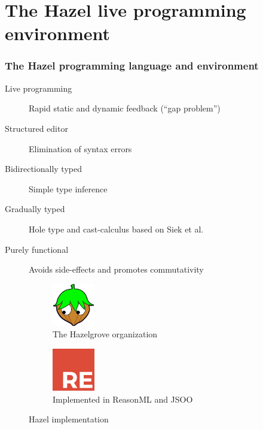 \documentclass{beamer}
\begin{document}
\section{The Hazel live programming environment}

\begin{frame}
  \frametitle{The Hazel programming language and environment}

  \begin{description}
  \item[Live programming] Rapid static and dynamic feedback (``gap problem'')
  \item[Structured editor] Elimination of syntax errors
  \item[Bidirectionally typed] Simple type inference
  \item[Gradually typed] Hole type and cast-calculus based on Siek et al. \cite{Siek06gradualtyping,siek2015refined}
  \item[Purely functional] Avoids side-effects and promotes commutativity
  \end{description}

  \begin{figure}
    \centering
    \begin{subfigure}[b]{0.5\textwidth}
      \centering
      \includegraphics[height=5em]{thesis/img/hazelgrove.png}
      \caption{The Hazelgrove organization}
    \end{subfigure}%
    \begin{subfigure}[b]{0.5\textwidth}
      \centering
      \includegraphics[height=5em]{thesis/img/reasonml.png}
      \caption{Implemented in ReasonML and JSOO}
    \end{subfigure}
    \caption{Hazel implementation}
  \end{figure}
\end{frame}
\end{document}
